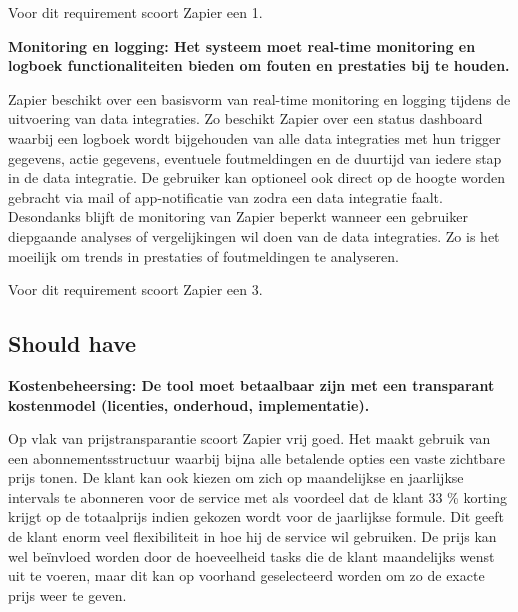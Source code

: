 Voor dit requirement scoort Zapier een 1.


\vspace{\baselineskip}


\textbf{Monitoring en logging: Het systeem moet real-time monitoring en logboek functionaliteiten bieden om fouten en prestaties bij te houden.}

\vspace{\baselineskip}

Zapier beschikt over een basisvorm van real-time monitoring en logging tijdens de uitvoering van data integraties. Zo beschikt Zapier over een status dashboard waarbij een logboek wordt bijgehouden van alle data integraties met hun trigger gegevens, actie gegevens, eventuele foutmeldingen en de duurtijd van iedere stap in de data integratie. De gebruiker kan optioneel ook direct op de hoogte worden gebracht via mail of app-notificatie van zodra een data integratie faalt. Desondanks blijft de monitoring van Zapier beperkt wanneer een gebruiker diepgaande analyses of vergelijkingen wil doen van de data integraties. Zo is het moeilijk om trends in prestaties of foutmeldingen te analyseren.


Voor dit requirement scoort Zapier een 3.


\vspace{\baselineskip}

\subsection{Should have}%
\label{ShouldHaveZapier}

\textbf{Kostenbeheersing: De tool moet betaalbaar zijn met een transparant kostenmodel (licenties, onderhoud, implementatie).}

\vspace{\baselineskip}

Op vlak van prijstransparantie scoort Zapier vrij goed. Het maakt gebruik van een abonnementsstructuur waarbij bijna alle betalende opties een vaste zichtbare prijs tonen. De klant kan ook kiezen om zich op maandelijkse en jaarlijkse intervals te abonneren voor de service met als voordeel dat de klant 33 \% korting krijgt op de totaalprijs indien gekozen wordt voor de jaarlijkse formule. Dit geeft de klant enorm veel flexibiliteit in hoe hij de service wil gebruiken. De prijs kan wel beïnvloed worden door de hoeveelheid tasks die de klant maandelijks wenst uit te voeren, maar dit kan op voorhand geselecteerd worden om zo de exacte prijs weer te geven.

